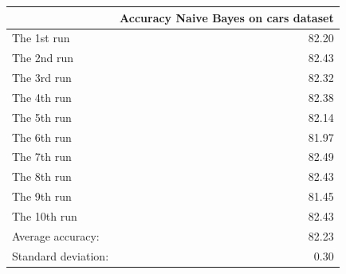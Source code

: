 \begin{tabular}{lr}
\toprule
{} &  Accuracy Naive Bayes on cars dataset \\
\midrule
The 1st run         &                                 82.20 \\
The 2nd run         &                                 82.43 \\
The 3rd run         &                                 82.32 \\
The 4th run         &                                 82.38 \\
The 5th run         &                                 82.14 \\
The 6th run         &                                 81.97 \\
The 7th run         &                                 82.49 \\
The 8th run         &                                 82.43 \\
The 9th run         &                                 81.45 \\
The 10th run        &                                 82.43 \\
Average accuracy:   &                                 82.23 \\
Standard deviation: &                                  0.30 \\
\bottomrule
\end{tabular}

